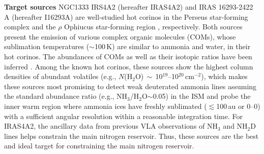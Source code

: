 \documentclass[12pt,a4paper]{article}  %
\begin{document}

\medskip
\noindent \textbf{Target sources} \quad NGC1333 IRS4A2 (hereafter IRAS4A2) and IRAS 16293-2422 A (hereafter I16293A) are well-studied hot corinos in the Perseus star-forming complex \citep[$\sim$300\,pc;][]{Zucker18} and the $\rho$ Ophiucus star-forming region \citep[$\sim$140\,pc;][]{Dzib18}, respectively. Both sources present the emission of various complex organic molecules (COMs), whose sublimation temperatures ($\sim$100\,K) are similar to ammonia and water, in their hot corinos. The abundances of COMs as well as their isotopic ratios have been inferred \citep[e.g.,][]{Lopez-Sepulcre17, Manigand20}. Among the known hot corinos, these sources show the highest column densities of abundant volatiles (e.g., $N$(H$_2$O)$\,\sim\,$10$^{19}$--10$^{20}$\,cm$^{-2}$), which makes these sources most promising to detect weak deuterated ammonia lines assuming the standard abundance ratio (e.g., NH$_3$/H$_2$O$\sim$0.05) in the ISM and probe the inner warm region where ammonia ices have freshly sublimated ($\lesssim$100\,au or 0--0) with a sufficient angular resolution within a reasonable integration time. For IRAS4A2, %
the ancillary data from previous VLA observations of NH$_3$ and NH$_2$D lines helps constrain the main nitrogen reservoir. Thus, these sources are the best and ideal target for constraining the main nitrogen reservoir.


    
\end{document}
